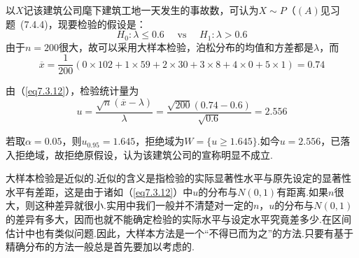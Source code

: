 \begin{solution}
	以$X$记该建筑公司麾下建筑工地一天发生的事故数，可认为$X\sim P（(A)$见习题~(7.4.4)，现要检验的假设是：
	\[H _ { 0 } : \lambda \leq 0.6 \quad \text { vs } \quad H _ { 1 } : \lambda > 0.6\]
	由于$n=200$很大，故可以采用大样本检验，泊松分布的均值和方差都是$\lambda$，而
	\[\overline { x } = \frac { 1 } { 200 } ( 0 \times 102 + 1 \times 59 + 2 \times 30 + 3 \times 8 + 4 \times 0 + 5 \times 1 )=0.74\]
	
	由（\ref{eq7.3.12}），检验统计量为
	\[u = \frac { \sqrt { n } ( \overline { x } - \lambda ) } { \lambda } = \frac { \sqrt { 200 } ( 0.74 - 0.6 ) } { \sqrt { 0.6 } } = 2.556\]

	若取$\alpha=0.05$，则$u_{0.95}=1.645$，拒绝域为$W=\{u\geq 1.645\}$.如今$u=
	2.556$，已落入拒绝域，故拒绝原假设，认为该建筑公司的宣称明显不成立.
	
	大样本检验是近似的.近似的含义是指检验的实际显著性水平与原先设定的显著性水平有差距，这是由于诸如（\ref{eq7.3.12}）中$u$的分布与$N(0,1)$有距离.如果$n$很大，则这种差异就很小.实用中我们一般并不清楚对一定的$n$，$u$的分布与$N(0,1)$的差异有多大，因而也就不能确定检验的实际水平与设定水平究竟差多少.在区间估计中也有类似问题.因此，大样本方法是一个“不得已而为之”的方法.只要有基于精确分布的方法一般总是首先要加以考虑的.
\end{solution}
